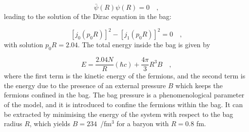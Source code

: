 \begin{equation*}
    \bar{\psi}(R)\psi(R) = 0\quad ,
\end{equation*}
leading to the solution of the Dirac equation in the bag:

\begin{equation*}
    \left[j_0\left(p_0R\right)\right]^2 - \left[j_1\left(p_0R\right)\right]^2 = 0\quad ,
\end{equation*}
with solution $p_0R = 2.04$. The total energy inside the bag is given by

\begin{equation*}
    E = \frac{2.04 N}{R}(\hbar c) + \frac{4\pi}{3}R^3B\quad ,
\end{equation*}
where the first term is the kinetic energy of the fermions, and the second term is the energy due to the presence of an external pressure $B$ which keeps the fermions confined in the bag. The bag pressure is a phenomenological parameter of the model, and it is introduced to confine the fermions within the bag. It can be extracted by minimising the energy of the system with respect to the bag radius $R$, which yields $B=234$~\mev/fm$^3$ for a baryon with $R=0.8$ fm.

